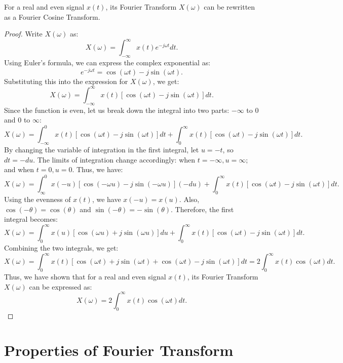 \documentclass{ee102_notes}
\begin{document}
\begin{proposition}
For a real and even signal $x(t)$, its Fourier Transform $X(\omega)$ can be rewritten as a Fourier Cosine Transform.
\end{proposition}
\begin{proof}
Write $X(\omega)$ as:
\[
X(\omega) = \int_{-\infty}^{\infty} x(t) e^{-j \omega t} dt.
\]
Using Euler's formula, we can express the complex exponential as:
\[
e^{-j \omega t} = \cos(\omega t) - j \sin(\omega t).
\]
Substituting this into the expression for $X(\omega)$, we get:
\[
X(\omega) = \int_{-\infty}^{\infty} x(t) [\cos(\omega t) - j \sin(\omega t)] dt.
\]
Since the function is even, let us break down the integral into two parts: $-\infty$ to $0$ and $0$ to $\infty$:
\[
X(\omega) = \int_{-\infty}^{0} x(t) [\cos(\omega t) - j \sin(\omega t)] dt + \int_{0}^{\infty} x(t) [\cos(\omega t) - j \sin(\omega t)] dt.
\]
By changing the variable of integration in the first integral, let $u = -t$, so $dt = -du$. The limits of integration change accordingly: when $t = -\infty, u = \infty;$ and when $t = 0, u = 0$. Thus, we have:
\[
X(\omega) = \int_{\infty}^{0} x(-u) [\cos(-\omega u) - j \sin(-\omega u)] (-du) + \int_{0}^{\infty} x(t) [\cos(\omega t) - j \sin(\omega t)] dt.
\]
Using the evenness of $x(t)$, we have $x(-u) = x(u)$. Also, $\cos(-\theta) = \cos(\theta)$ and $\sin(-\theta) = -\sin(\theta)$. Therefore, the first integral becomes:
\[
X(\omega) = \int_{0}^{\infty} x(u) [\cos(\omega u) + j \sin(\omega u)] du + \int_{0}^{\infty} x(t) [\cos(\omega t) - j \sin(\omega t)] dt.
\]
Combining the two integrals, we get:
\[
X(\omega) = \int_{0}^{\infty} x(t) [\cos(\omega t) + j \sin(\omega t) + \cos(\omega t) - j \sin(\omega t)] dt = 2 \int_{0}^{\infty} x(t) \cos(\omega t) dt.
\]
Thus, we have shown that for a real and even signal $x(t)$, its Fourier Transform $X(\omega)$ can be expressed as:
\[
X(\omega) = 2 \int_{0}^{\infty} x(t) \cos(\omega t) dt.
\]
\end{proof}
\section{Properties of Fourier Transform}
\end{document}

